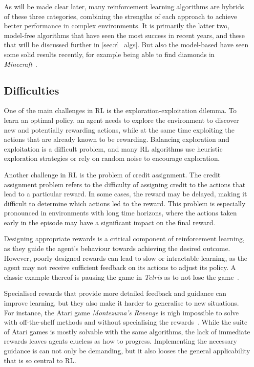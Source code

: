 As will be made clear later, many reinforcement learning algorithms are hybrids of these three categories, combining the strengths of each approach to achieve better performance in complex environments.
It is primarily the latter two, model-free algorithms that have seen the most success in recent years, and these that will be discussed further in \cref{sec:rl_algs}.
But also the model-based have seen some solid results recently, for example being able to find diamonds in \textit{Minecraft}~\autocite{hafner2023}.


\subsection{Difficulties}
\label{sec:difficulties}
One of the main challenges in RL is the exploration-exploitation dilemma.
To learn an optimal policy, an agent needs to explore the environment to discover new and potentially rewarding actions, while at the same time exploiting the actions that are already known to be rewarding.
Balancing exploration and exploitation is a difficult problem, and many RL algorithms use heuristic exploration strategies or rely on random noise to encourage exploration.

Another challenge in RL is the problem of credit assignment.
The credit assignment problem refers to the difficulty of assigning credit to the actions that lead to a particular reward.
In some cases, the reward may be delayed, making it difficult to determine which actions led to the reward.
This problem is especially pronounced in environments with long time horizons, where the actions taken early in the episode may have a significant impact on the final reward.

Designing appropriate rewards is a critical component of reinforcement learning, as they guide the agent's behaviour towards achieving the desired outcome.
However, poorly designed rewards can lead to slow or intractable learning, as the agent may not receive sufficient feedback on its actions to adjust its policy.
A classic example thereof is pausing the game in \textit{Tetris} as to not lose the game~\autocite{murphy2013}.

Specialised rewards that provide more detailed feedback and guidance can improve learning, but they also make it harder to generalise to new situations.
For instance, the Atari game \textit{Montezuma's Revenge} is nigh impossible to solve with off-the-shelf methods and without specialising the rewards~\autocite{salimans2018}.
While the suite of Atari games is mostly solvable with the same algorithms, the lack of immediate rewards leaves agents clueless as how to progress.
Implementing the necessary guidance is can not only be demanding, but it also looses the general applicability that is so central to RL.

